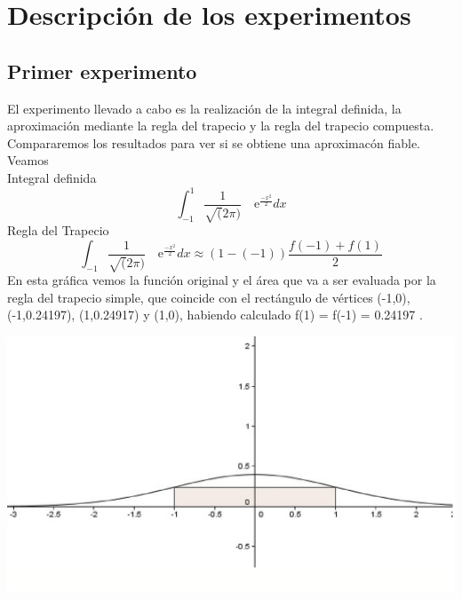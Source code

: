 


\section{Descripción de los experimentos}
\label{3:sec:1}

\subsection{Primer experimento}
El experimento llevado a cabo es la realización de la integral definida, la aproximación
mediante la regla del trapecio y la regla del trapecio compuesta. Compararemos los resultados para ver si se obtiene una aproximacón fiable.
 Veamos\\
Integral definida 
\[
\int_{-1}^{1} \frac{1}{\sqrt(2\pi)} \quad\text{e}^{\frac{-x^2}{2}}dx
\]
Regla del Trapecio
\[
\int_{-1}^{} \frac{1}{\sqrt(2\pi)} \quad\text{e}^{\frac{-x^2}{2}}dx\approx\left(1-(-1)\right)\frac{f(-1)+f(1)}{2}
\]
En esta gráfica vemos la función original y el área que va a ser evaluada por la regla del trapecio simple, que coincide con el rectángulo de vértices (-1,0), (-1,0.24197), (1,0.24917)
 y (1,0), habiendo calculado f(1) = f(-1) = 0.24197 .

\includegraphics[width=1.15\textwidth]{images/trasim}

